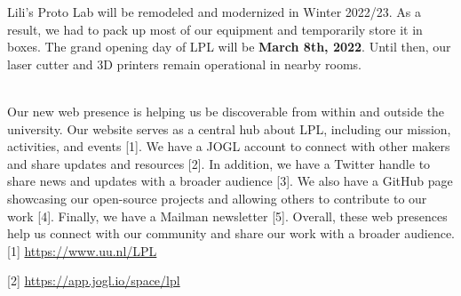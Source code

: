 \documentclass{report}
\begin{document}
Lili's Proto Lab will be remodeled and modernized in Winter 2022/23. As a result, we had to pack up most of our equipment and temporarily store it in boxes. The grand opening day of LPL will be \textbf{March 8th, 2022}. Until then, our laser cutter and 3D printers remain operational in nearby rooms. 

\clearpage
\begin{figure}
    \centering
\end{figure}
\clearpage

 \\

Our new web presence is helping us be discoverable from within and outside the university. Our website serves as a central hub about LPL, including our mission, activities, and events [1]. We have a JOGL account to connect with other makers and share updates and resources [2]. In addition, we have a Twitter handle to share news and updates with a broader audience [3]. We also have a GitHub page showcasing our open-source projects and allowing others to contribute to our work [4]. Finally, we have a Mailman newsletter [5]. Overall, these web presences help us connect with our community and share our work with a broader audience. \\

[1] \url{https://www.uu.nl/LPL}

[2] \url{https://app.jogl.io/space/lpl}
\end{document}
